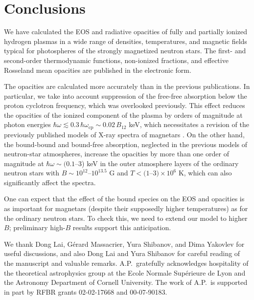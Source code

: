 \documentclass{emulateapj}
\newcommand{\omp}{\omega_\mathrm{cp}}
\begin{document}
\section{Conclusions}
We have calculated the EOS and radiative opacities of 
fully and partially ionized hydrogen plasmas in a wide range
of densities, temperatures, and magnetic fields
typical for photospheres of the strongly magnetized neutron stars.
The first- and second-order thermodynamic functions, 
non-ionized fractions,
and effective Rosseland mean opacities
are published in the electronic form.

The opacities are calculated more accurately than in the previous
publications. In particular, we take into account  
suppression of the free-free absorption below the proton
cyclotron frequency, which was overlooked previously.
This effect reduces the opacities of the ionized component of
the plasma by orders of magnitude at photon energies
$\hbar\omega\lesssim0.3\,\hbar\omp\sim 0.02\,B_{12}$ keV,
which necessitates a revision of the previously published
models of X-ray spectra of magnetars 
\citep{Zane01,HoLai,HoLai02,Ozel01,Ozel02}.
On the other hand, the bound-bound and bound-free absorption,
neglected in the previous models of neutron-star atmospheres,
increase the opacities by more than one order of magnitude   
at $\hbar\omega\sim(0.1$--3) keV in the outer atmosphere layers of 
the ordinary neutron stars
with $B\sim10^{12}$--$10^{13.5}$ G and $T < (1$--$3)\times10^6$ K,
which can also significantly affect the spectra.

One can expect that the effect of the bound species
on the EOS and opacities is as important 
for magnetars (despite their supposedly higher temperatures) 
as for the ordinary neutron stars.
To check this, we need to extend our model to higher $B$;
preliminary high-$B$ results \citep{CDP02} support this anticipation.

      \acknowledgements
We thank
Dong Lai, G\'erard Massacrier, Yura Shibanov, and Dima Yakovlev
for useful discussions, and also Dong Lai and Yura Shibanov 
for careful reading of the manuscript and valuable remarks. 
A.P.\ gratefully acknowledges hospitality
of the theoretical astrophysics group 
at the Ecole Normale Sup\'erieure de Lyon
and the Astronomy Department of Cornell University.
The work of A.P.\ is supported in part by RFBR grants 
02-02-17668 and 00-07-90183.
\end{document}
